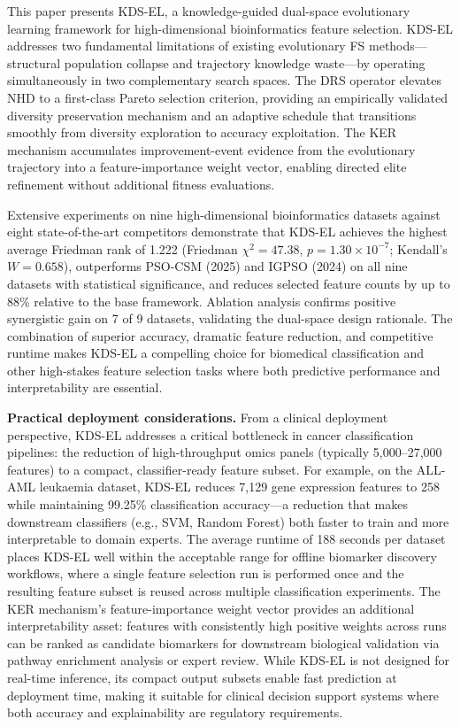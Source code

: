 \documentclass[a4paper,fleqn]{cas-dc}
\begin{document}
\begin{sloppypar}
	\par{
	This paper presents KDS-EL, a knowledge-guided dual-space
	evolutionary learning framework for high-dimensional bioinformatics
	feature selection.
	KDS-EL addresses two fundamental limitations of existing
	evolutionary FS methods---structural population collapse and
	trajectory knowledge waste---by operating simultaneously in two
	complementary search spaces.
	The DRS operator elevates NHD to a first-class Pareto selection
	criterion, providing an empirically validated diversity preservation
	mechanism and an adaptive schedule that transitions smoothly from
	diversity exploration to accuracy exploitation.
	The KER mechanism accumulates improvement-event evidence from the
	evolutionary trajectory into a feature-importance weight vector,
	enabling directed elite refinement without additional fitness
	evaluations.
	}

	\par{
	Extensive experiments on nine high-dimensional bioinformatics
	datasets against eight state-of-the-art competitors demonstrate
	that KDS-EL achieves the highest average Friedman rank of 1.222
	(Friedman $\chi^2 = 47.38$, $p = 1.30 \times 10^{-7}$; Kendall's $W = 0.658$),
	outperforms PSO-CSM (2025) and IGPSO (2024) on all nine datasets
	with statistical significance, and reduces selected feature counts
	by up to 88\% relative to the base framework.
	Ablation analysis confirms positive synergistic gain on 7 of 9
	datasets, validating the dual-space design rationale.
	The combination of superior accuracy, dramatic feature reduction,
	and competitive runtime makes KDS-EL a compelling choice for
	biomedical classification and other high-stakes feature selection
	tasks where both predictive performance and interpretability are
	essential.
	}

	\par{
	\textbf{Practical deployment considerations.}
	From a clinical deployment perspective, KDS-EL addresses a critical
	bottleneck in cancer classification pipelines: the reduction of
	high-throughput omics panels (typically 5{,}000--27{,}000 features)
	to a compact, classifier-ready feature subset.
	For example, on the ALL-AML leukaemia dataset, KDS-EL reduces
	7{,}129 gene expression features to 258 while maintaining 99.25\%
	classification accuracy---a reduction that makes downstream
	classifiers (e.g., SVM, Random Forest) both faster to train and
	more interpretable to domain experts.
	The average runtime of 188 seconds per dataset places KDS-EL well
	within the acceptable range for offline biomarker discovery
	workflows, where a single feature selection run is performed once
	and the resulting feature subset is reused across multiple
	classification experiments.
	The KER mechanism's feature-importance weight vector provides an
	additional interpretability asset: features with consistently high
	positive weights across runs can be ranked as candidate biomarkers
	for downstream biological validation via pathway enrichment
	analysis or expert review.
	While KDS-EL is not designed for real-time inference, its compact
	output subsets enable fast prediction at deployment time, making it
	suitable for clinical decision support systems where both accuracy
	and explainability are regulatory requirements.
	}


\end{sloppypar}
\end{document}
